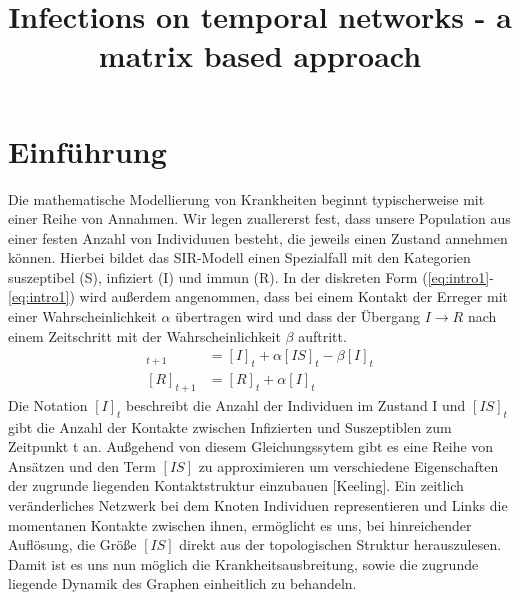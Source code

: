 
\title{Infections on temporal networks - a matrix based approach}
\date{}
\author{}


\maketitle

\section{Einführung}

Die mathematische Modellierung von Krankheiten beginnt typischerweise mit einer Reihe von Annahmen. Wir legen zuallererst fest, dass unsere Population aus einer festen Anzahl von Individuuen besteht, die jeweils einen Zustand annehmen können. Hierbei bildet das SIR-Modell einen Spezialfall mit den Kategorien suszeptibel (S), infiziert (I) und immun (R). In der diskreten Form (\ref{eq:intro1}-\ref{eq:intro1}) wird außerdem angenommen, dass bei einem Kontakt der Erreger mit einer Wahrscheinlichkeit $\alpha$ übertragen wird und dass der Übergang $I \rightarrow R$ nach einem Zeitschritt mit der Wahrscheinlichkeit $\beta$ auftritt.
\begin{align}
 [I]_{t+1} &= [I]_t  + \alpha [IS]_t - \beta [I]_t \label{eq:intro1} \\
 [R]_{t+1} &= [R]_t + \alpha [I]_t \label{eq:intro2}
\end{align}
Die Notation $[I]_t$ beschreibt die Anzahl der Individuen im Zustand I und $[IS]_t$ gibt die Anzahl der Kontakte zwischen Infizierten und Suszeptiblen zum Zeitpunkt t an. Außgehend von diesem Gleichungssytem gibt es eine Reihe von Ansätzen und den Term $[IS]$ zu approximieren um verschiedene Eigenschaften der zugrunde liegenden Kontaktstruktur einzubauen [Keeling].
Ein zeitlich veränderliches Netzwerk bei dem Knoten Individuen representieren und Links die momentanen Kontakte zwischen ihnen, ermöglicht es uns, bei hinreichender Auflösung, die Größe $[IS]$ direkt aus der topologischen Struktur herauszulesen. Damit ist es uns nun möglich die Krankheitsausbreitung, sowie die zugrunde liegende Dynamik des Graphen einheitlich zu behandeln.

